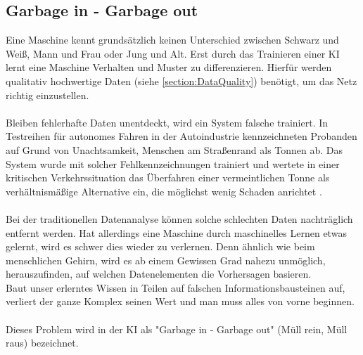 \documentclass[12pt,oneside,a4paper,parskip]{scrbook}
\begin{document}
\subsection{Garbage in - Garbage out}
\label{section:DataGarbage}
Eine Maschine kennt grundsätzlich keinen Unterschied zwischen Schwarz und Weiß, Mann und Frau oder Jung und Alt. Erst durch das Trainieren einer KI lernt eine Maschine Verhalten und Muster zu differenzieren. Hierfür werden qualitativ hochwertige Daten (siehe \ref{section:DataQuality}) benötigt, um das Netz richtig einzustellen.
\\\\
Bleiben fehlerhafte Daten unentdeckt, wird ein System falsche trainiert. In Testreihen für autonomes Fahren in der Autoindustrie kennzeichneten Probanden auf Grund von Unachtsamkeit, Menschen am Straßenrand als Tonnen ab. Das System wurde mit solcher Fehlkennzeichnungen trainiert und wertete in einer kritischen Verkehrssituation das Überfahren einer vermeintlichen Tonne als verhältnismäßige Alternative ein, die möglichst wenig Schaden anrichtet \cite{trainingsDataKI}.
\\\\
Bei der traditionellen Datenanalyse können solche schlechten Daten nachträglich entfernt werden. Hat allerdings eine Maschine durch maschinelles Lernen etwas gelernt, wird es schwer dies wieder zu verlernen. Denn ähnlich wie beim menschlichen Gehirn, wird es ab einem Gewissen Grad nahezu unmöglich, herauszufinden, auf welchen Datenelementen die Vorhersagen basieren.\\
Baut unser erlerntes Wissen in Teilen auf falschen Informationsbausteinen auf, verliert der ganze Komplex seinen Wert und man muss alles von vorne beginnen.
\\\\
Dieses Problem wird in der KI als "Garbage in - Garbage out" (Müll rein, Müll raus) bezeichnet.
\end{document}
